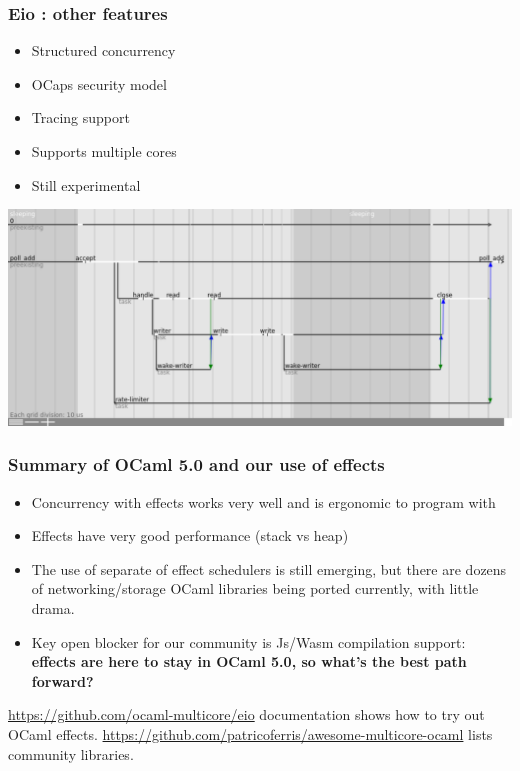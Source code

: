 \documentclass{beamer}
\begin{document}
\begin{frame}
	\frametitle{Eio : other features}
	\begin{itemize}
		\item Structured concurrency
		\item OCaps security model
		\item Tracing support
		\item Supports multiple cores
		\item Still experimental
	\end{itemize}
	\includegraphics[width=\textwidth]{trace.png}
\end{frame}

\begin{frame}
	\frametitle{Summary of OCaml 5.0 and our use of effects}
	\begin{itemize}
		\item Concurrency with effects works very well and is ergonomic to program with
		\item Effects have very good performance (stack vs heap)
		\item The use of separate of effect schedulers is still emerging, but there are dozens
		of networking/storage OCaml libraries being ported currently, with little drama.
    \item Key open blocker for our community is Js/Wasm compilation support:
    \textbf{effects are here to stay in OCaml 5.0, so what's the best path forward?}
	\end{itemize}
	\bigskip
	\url{https://github.com/ocaml-multicore/eio} documentation shows how to try out OCaml effects.
  \url{https://github.com/patricoferris/awesome-multicore-ocaml} lists community libraries.
\end{frame}

\end{document}
